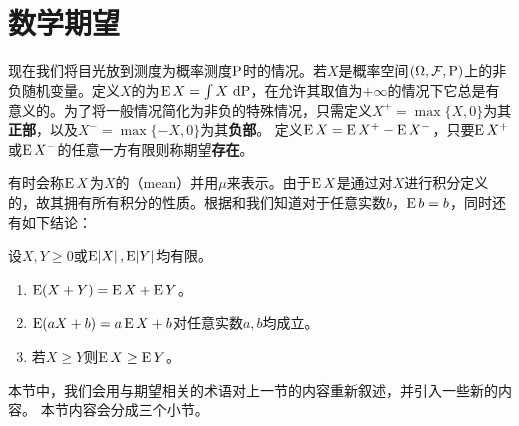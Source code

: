 \documentclass[../main.tex]{subfiles}
\begin{document}
\section{数学期望} \label{sec:1.6}
现在我们将目光放到测度为概率测度\(\operatorname{\mathrm{P}}\)时的情况。若\(X\)是概率空间\((\Omega,\mathcal{F},\operatorname{\mathrm{P}})\)上的非负随机变量。定义\(X\)的为\(\E X=\int X\,\dif\probP\)，在允许其取值为\(+\infty\)的情况下它总是有意义的。为了将一般情况简化为非负的特殊情况，只需定义\(X^+=\max\{X,0\}\)为其\textbf{正部}，以及\(X^-=\max\{-X,0\}\)为其\textbf{负部}。
定义\(\operatorname{E} X=\operatorname{E} X^+-\operatorname{E} X^-\)，只要\(\operatorname{E} X^+\)或\(\operatorname{E} X^-\)的任意一方有限则称期望\textbf{存在}。

有时会称\(\operatorname{E} X\)为\(X\)的（mean）并用\(\mu\)来表示。由于\(\operatorname{E} X\)是通过对\(X\)进行积分定义的，故其拥有所有积分的性质。根据和我们知道对于任意实数\(b\)，\(\operatorname{E} b=b\)，同时还有如下结论：
\begin{theorem}
	\label{thm:1.6.1}
	设\(X,Y\geq0\)或\(\E\envert{X},\E\envert{Y}\)均有限。

	\begin{enumerate}[label=(\alph*)]
		\item \(\operatorname{E}(X+Y)=\operatorname{E} X+\operatorname{E} Y\)。
		\item \label{thm:1.6.1.2}\(\operatorname{E}(aX+b)=a\operatorname{E} X+b\)对任意实数\(a,b\)均成立。
		\item \label{thm:1.6.1.3} 若\(X\geq Y\)则\(\operatorname{E} X\geq \operatorname{E} Y\)。
	\end{enumerate}
\end{theorem}
本节中，我们会用与期望相关的术语对上一节的内容重新叙述，并引入一些新的内容。
本节内容会分成三个小节。
\end{document}
